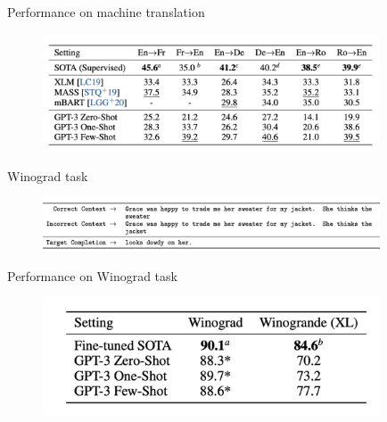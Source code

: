 \begin{vbframe}{Performance on machine translation}

\vfill

	\begin{figure}
		\centering
		\includegraphics[width=10cm]{figure/mtperf.png}\\
	\end{figure}

\vfill

\end{vbframe}


\begin{vbframe}{Winograd task}

\vfill

	\begin{figure}
		\centering
		\includegraphics[width=10cm]{figure/winogradformat.png}\\
	\end{figure}

\vfill

\end{vbframe}



\begin{vbframe}{Performance on Winograd task}

\vfill

	\begin{figure}
		\centering
		\includegraphics[width=10cm]{figure/winogradperf.png}\\
	\end{figure}

\vfill

\end{vbframe}


